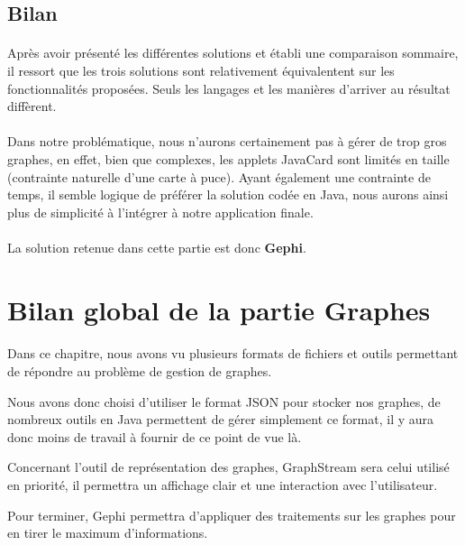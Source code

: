   
  \subsection{Bilan}
  
  \paragraph{}
  Après avoir présenté les différentes solutions et établi une comparaison sommaire, il ressort que les trois solutions sont relativement équivalentent sur les fonctionnalités proposées. Seuls les langages et les manières d'arriver au résultat diffèrent.
  
  \paragraph{}
  Dans notre problématique, nous n'aurons certainement pas à gérer de trop gros graphes, en effet, bien que complexes, les applets JavaCard sont limités en taille (contrainte naturelle d'une carte à puce). Ayant également une contrainte de temps, il semble logique de préférer la solution codée en Java, nous aurons ainsi plus de simplicité à l'intégrer à notre application finale.
  
  \paragraph{}La solution retenue dans cette partie est donc \textbf{Gephi}.
  
  \section{Bilan global de la partie Graphes}
  
  \paragraph{}
  Dans ce chapitre, nous avons vu plusieurs formats de fichiers et outils permettant de répondre au problème de gestion de graphes.
  
  Nous avons donc choisi d'utiliser le format JSON pour stocker nos graphes, de nombreux outils en Java permettent de gérer simplement ce format, il y aura donc moins de travail à fournir de ce point de vue là.
  
  Concernant l'outil de représentation des graphes, GraphStream sera celui utilisé en priorité, il permettra un affichage clair et une interaction avec l'utilisateur.
  
  Pour terminer, Gephi permettra d'appliquer des traitements sur les graphes pour en tirer le maximum d'informations.
  
  
